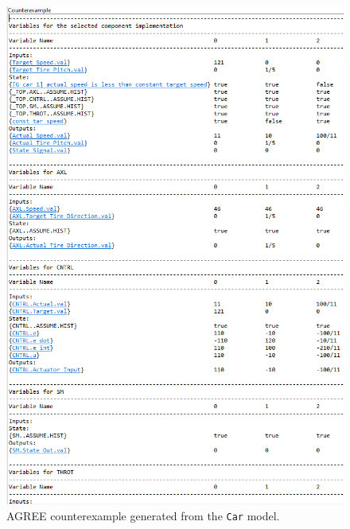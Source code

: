 \begin{figure}[h] 
	\centering 
	\includegraphics[width=\columnwidth]{cex.png}
	\caption{AGREE counterexample generated from the \texttt{Car} model.}
	\label{fig:cex} 
\end{figure}



